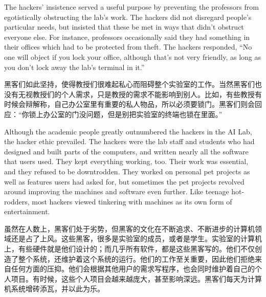 \ifdefined\eng
The hackers' insistence served a useful purpose by preventing the professors from egotistically obstructing the lab's work.  The hackers did not disregard people's particular needs, but insisted that these be met in ways that didn't obstruct everyone else.  For instance, professors occasionally said they had something in their offices which had to be protected from theft.  The hackers responded, ``No one will object if you lock your office, although that's not very friendly, as long as you don't lock away the lab's terminal in it.''
\fi

\ifdefined\chs
黑客们如此坚持，使得教授们很难起私心而阻碍整个实验室的工作。当然黑客们也没有无视教授们的个人需求，只是教授的需求不能影响到别人。比如，有些教授有时候会辩解称，自己办公室里有重要的私人物品，所以必须要锁门。黑客们则会回应：``你锁上办公室的门没问题，但是别把实验室的终端也锁在里面。''
\fi

\ifdefined\eng
Although the academic people greatly outnumbered the hackers in the AI Lab, the hacker ethic prevailed. The hackers were the lab staff and students who had designed and built parts of the computers, and written nearly all the software that users used.  They kept everything working, too.  Their work was essential, and they refused to be downtrodden.  They worked on personal pet projects as well as features users had asked for, but sometimes the pet projects revolved around improving the machines and software even further. Like teenage hot-rodders, most hackers viewed tinkering with machines as its own form of entertainment.
\fi

\ifdefined\chs
虽然在人数上，黑客们处于劣势，但黑客的文化在不断追求、不断进步的计算机领域还是占了上风。这些黑客，很多是实验室的成员，或者是学生。实验室的计算机上，有些硬件就是他们设计的；而几乎所有软件，都是这些黑客写的。他们不仅创造了整个系统，还维护着这个系统的运行。他们的工作至关重要，因此他们拒绝来自任何方面的压抑。他们会根据其他用户的需求写程序，也会同时维护着自己的个人项目。有时候，这些个人项目会越来越庞大，甚至影响深远。黑客们每天为计算机系统增砖添瓦，并以此为乐。
\fi

